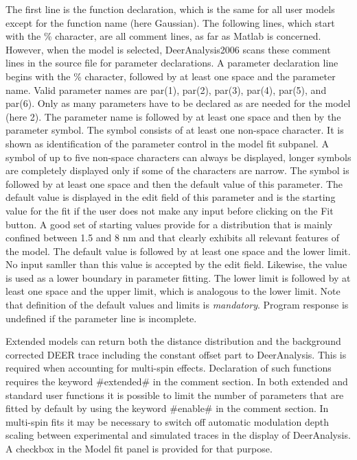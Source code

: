 \documentclass{article}
\begin{document}
The first line is the function declaration, which is the same for all user models except for the function name (here {\ttfamily Gaussian}). The following lines, which start with the \% character, are all comment lines, as far as Matlab is concerned. However, when the model is selected, DeerAnalysis2006 scans these comment lines in the source file for parameter declarations. A parameter declaration line begins with the \% character, followed by at least one space and the parameter name. Valid parameter names are {\ttfamily par(1)}, {\ttfamily par(2)}, {\ttfamily par(3)}, {\ttfamily par(4)}, {\ttfamily par(5)}, and {\ttfamily par(6)}. Only as many parameters have to be declared as are needed for the model (here 2). The parameter name is followed by at least one space and then by the parameter symbol. The symbol consists of at least one non-space character. It is shown as identification of the parameter control in the {\ttfamily model fit} subpanel. A symbol of up to five non-space characters can always be displayed, longer symbols are completely displayed only if some of the characters are narrow. The symbol is followed by at least one space and then the default value of this parameter. The default value is displayed in the edit field of this parameter and is the starting value for the fit if the user does not make any input before clicking on the {\ttfamily Fit} button. A good set of starting values provide for a distribution that is mainly confined between 1.5 and 8 nm and that clearly exhibits all relevant features of the model. The default value is followed by at least one space and the lower limit. No input samller than this value is accepted by the edit field. Likewise, the value is used as a lower boundary in parameter fitting. The lower limit is followed by at least one space and the upper limit, which is analogous to the lower limit. Note that definition of the default values and limits is \emph{mandatory}. Program response is undefined if the parameter line is incomplete.    

Extended models can return both the distance distribution and the background corrected DEER trace including the constant offset part to DeerAnalysis. This is required when accounting for multi-spin effects. Declaration of such functions requires the keyword {\ttfamily \#extended\#} in the comment section. In both extended and standard user functions it is possible to limit the number of parameters that are fitted by default by using the keyword {\ttfamily \#enable\#} in the comment section. In multi-spin fits it may be necessary to switch off automatic modulation depth scaling between experimental and simulated traces in the display of DeerAnalysis. A checkbox in the {\ttfamily Model fit} panel is provided for that purpose.
\end{document}
